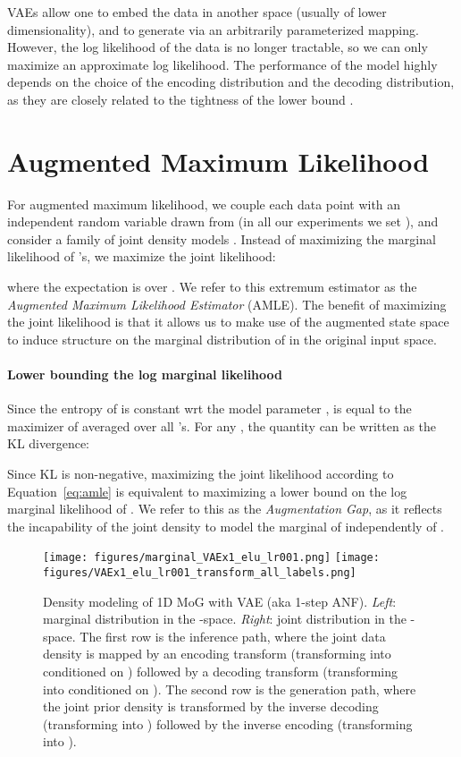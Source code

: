 \documentclass{article}
\begin{document}
VAEs allow one to embed the data in another space (usually of lower dimensionality), and to generate via an arbitrarily parameterized mapping. 
However, the log likelihood of the data is no longer tractable, so we can only maximize an approximate log likelihood.
The performance of the model highly depends on the choice of the encoding distribution and the decoding distribution, as they are closely related to the tightness of the lower bound \citep{cremer2018inference}.




\section{Augmented Maximum Likelihood}
\label{sec:amle}
For augmented maximum likelihood, we couple each data point with an independent random variable  drawn from  (in all our experiments we set ), and consider a family of joint density models . 
Instead of maximizing the marginal likelihood of 's, we maximize the joint likelihood:

where the expectation is over .
We refer to this extremum estimator as the \emph{Augmented Maximum Likelihood Estimator} (AMLE).
The benefit of maximizing the joint likelihood is that it allows us to make use of the augmented state space to induce structure on the marginal distribution of  in
the original input space.


\paragraph{Lower bounding the log marginal likelihood} 
Since the entropy of  is constant wrt the model parameter ,  is equal to the maximizer of  averaged over all 's.
For any , the quantity  can be written as the KL divergence:


Since KL is non-negative, maximizing the joint likelihood according to Equation~\ref{eq:amle} is equivalent to maximizing a lower bound on the log marginal likelihood of .
We refer to this as the \emph{Augmentation Gap}, as it reflects the incapability of the joint density to model the marginal of  independently of . 



\begin{figure*}[th]
    \centering
    \texttt{[image: figures/marginal\_VAEx1\_elu\_lr001.png]}
    \hspace{0.6cm}
    \texttt{[image: figures/VAEx1\_elu\_lr001\_transform\_all\_labels.png]}
    \vspace{-2mm}
    \caption{\small 
    Density modeling of 1D MoG with VAE (aka 1-step ANF). \emph{Left}: marginal distribution in the -space. \emph{Right}: joint distribution in the -space. 
    The first row is the inference path, where the joint data density  is mapped by an encoding transform (transforming  into  conditioned on ) followed by a decoding transform (transforming  into  conditioned on ). 
    The second row is the generation path, where the joint prior density  is transformed by the inverse decoding (transforming  into ) followed by the inverse encoding (transforming  into ).}
    \label{fig:anf_1d_1}
\end{figure*}
\end{document}
